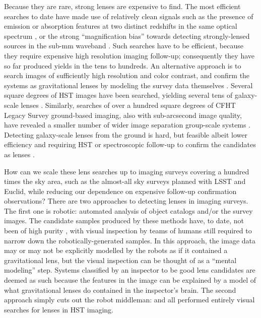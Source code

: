 \documentclass[useAMS,usenatbib,a4paper]{mn2e}
\begin{document}

Because they are rare, strong lenses are expensive to find. The most efficient
searches to date have made use of relatively clean signals such as the
presence of emission or absorption features at two distinct redshifts in the
same optical spectrum \citep[e.g.][]{BoltonEtal2004}, or the strong
``magnification bias'' towards detecting strongly-lensed sources in the sub-mm
waveband \citep[e.g.][]{NegrelloEtal2010}. Such searches have to be efficient,
because they require expensive high resolution imaging follow-up; consequently
they have so far produced yields in the tens to hundreds. An alternative approach
is to search images of sufficiently high resolution and color contrast, and
confirm the systems as gravitational lenses by modeling the survey data
themselves \citep[][]{MarshallEtal2009}. Several square degrees of HST images
have been searched, yielding several tens of galaxy-scale lenses
\citep[e.g.][]{MoustakasEtal2007,FaureEtal2008,Jackson2008,MoreEtal2012,
PawaseEtal2014}.
Similarly, searches of over a hundred square degrees of CFHT Legacy Survey
ground-based imaging, also with sub-arcsecond image quality, have revealed a
smaller number of wider image separation group-scale systems
\citep[e.g.][]{CabanacEtal2007,MoreEtal2012}. Detecting galaxy-scale lenses from
the ground is hard, but feasible albeit lower efficiency and requiring HST or
spectroscopic follow-up to confirm the candidates as lenses
\citep[e.g.][]{GavazziEtal2014}.


How can we scale these lens searches up to imaging surveys covering a hundred
times the sky area, such as the almost-all sky surveys planned with LSST and
Euclid, while reducing our dependence on expensive follow-up confirmation
observations? There are two approaches to detecting lenses in imaging surveys.
The first one is robotic: automated analysis of object catalogs and/or the
survey images. The candidate samples produced by these methods have, to date,
not been of high purity  \citep[see
e.g.][]{MarshallEtal2009,MoreEtal2012,GavazziEtal2014}, with visual inspection by
teams of humans still required to narrow down the robotically-generated
samples. In this approach, the image data may or may not be explicitly
modelled by the robots as if it contained a gravitational lens, but the visual
inspection can be thought of as a ``mental modeling'' step. Systems classified
by an inspector to be good lens candidates are deemed as such because the
features in the image can be explained by a model of what gravitational lenses
do contained in the inspector's brain. The second approach simply cuts out the
robot middleman: \citet{FaureEtal2008,Jackson2008} and \citet{PawaseEtal2014}
all performed entirely visual searches for lenses in HST imaging.
\end{document}
